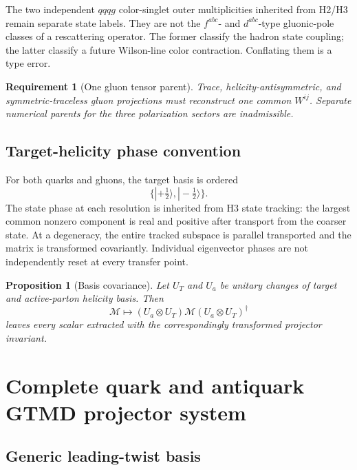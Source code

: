 \documentclass[11pt]{article}
\newtheorem{requirement}[definition]{Requirement}
\newtheorem{proposition}[definition]{Proposition}
\newcommand{\cM}{\mathcal M}
\begin{document}
The two independent \(qqqg\) color-singlet outer multiplicities inherited from
H2/H3 remain separate state labels.  They are not the \(f^{abc}\)- and
\(d^{abc}\)-type gluonic-pole classes of a rescattering operator.  The former
classify the hadron state coupling; the latter classify a future Wilson-line
color contraction.  Conflating them is a type error.

\begin{requirement}[One gluon tensor parent]
\label{req:one-gluon-tensor-parent}
Trace, helicity-antisymmetric, and symmetric-traceless gluon projections must
reconstruct one common \(W^{ij}\).  Separate numerical parents for the three
polarization sectors are inadmissible.
\end{requirement}

\subsection{Target-helicity phase convention}

For both quarks and gluons, the target basis is ordered
\begin{equation}
 \{|+\tfrac12\rangle,|-\tfrac12\rangle\}.
\end{equation}
The state phase at each resolution is inherited from H3 state tracking: the
largest common nonzero component is real and positive after transport from the
coarser state.  At a degeneracy, the entire tracked subspace is parallel
transported and the matrix is transformed covariantly.  Individual eigenvector
phases are not independently reset at every transfer point.

\begin{proposition}[Basis covariance]
Let \(U_T\) and \(U_a\) be unitary changes of target and active-parton helicity
basis.  Then
\begin{equation}
 \cM\mapsto
 (U_a\otimes U_T)\cM(U_a\otimes U_T)^\dagger
 \label{eq:matrix-basis-covariance}
\end{equation}
leaves every scalar extracted with the correspondingly transformed projector
invariant.
\end{proposition}

\section{Complete quark and antiquark GTMD projector system}
\label{sec:quark-projectors}

\subsection{Generic leading-twist basis}
\end{document}
